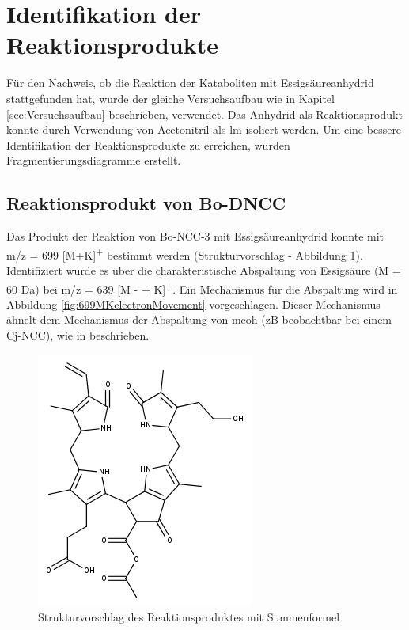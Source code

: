 \section{Identifikation der Reaktionsprodukte}

Für den Nachweis, ob die Reaktion der Kataboliten mit Essigsäureanhydrid stattgefunden hat, wurde der gleiche Versuchsaufbau wie in Kapitel \ref{sec:Versuchsaufbau} beschrieben, verwendet. Das Anhydrid als Reaktionsprodukt konnte durch Verwendung von Acetonitril als \gls{lm} isoliert werden. Um eine bessere Identifikation der Reaktionsprodukte zu erreichen, wurden Fragmentierungsdiagramme erstellt.  



\subsection{Reaktionsprodukt von Bo-DNCC}

Das Produkt der Reaktion von Bo-NCC-3 mit Essigsäureanhydrid konnte mit m/z = 699 [M+K]\textsuperscript{+} bestimmt werden (Strukturvorschlag - Abbildung \ref{fig:699MKstructure}). Identifiziert wurde es über die charakteristische Abspaltung von Essigsäure (M = 60 Da) bei m/z = 639 [M -  + K]\textsuperscript{+}. Ein Mechanismus für die Abspaltung wird in Abbildung \ref{fig:699MKelectronMovement} vorgeschlagen. Dieser Mechanismus ähnelt dem Mechanismus der Abspaltung von \gls{meoh} (\gls{zB} beobachtbar bei einem Cj-NCC), wie in \cite{StructureElucidation} beschrieben.\\

\begin{figure}[!htbp]
  \centering
  \includegraphics[scale=0.6]{figures/Kapitel4/Kataboliten/fragmentation_structures/VWA_Katabolit_699.png}
  \caption[Strukturvorschlag des Reaktionsproduktes von Bo-DNCC, Quelle: Autor]{Strukturvorschlag des Reaktionsproduktes mit Summenformel }
  \label{fig:699MKstructure}
\end{figure}

